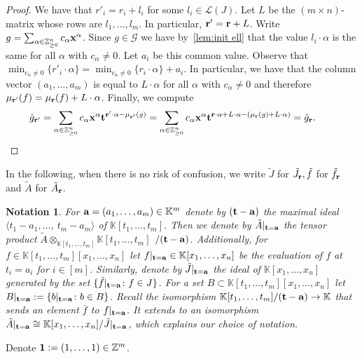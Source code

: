 \documentclass[10pt,a4paper]{amsart}
\newcommand{\thlabel}[1]{\label{#1}}
\newcommand{\thref}[1]{\ref{#1}}
\newtheorem{Notation}[Theorem]{Notation}
\numberwithin{equation}{section}
\begin{document}
\begin{proof}
We have that $r'_i=r_i+l_i$ for some $l_i \in \mathcal{L}(J)$. Let $L$ be the $(m \times n)$-matrix whose rows are $l_1, \dots , l_m$. In particular, ${\bf r'}={\bf r}+L$.
Write $g=\sum_{\alpha \in \mathbb Z^n_{\geq 0}}c_{\alpha} {\bf x}^{\alpha}$.
Since $g \in \mathcal{G}$ we have by~\thref{lem:init ell} that the value $l_i \cdot \alpha$ is the same for all $\alpha $ with $c_{\alpha}\neq 0$. Let $a_i$ be this common value.
Observe that $\min_{c_\alpha \neq 0}\{r'_i\cdot \alpha\}= \min_{c_\alpha \neq 0}\{r_i\cdot \alpha\}+a_i$. In particular, we have that the column vector $ (a_1, \dots , a_m)$ is equal to $ L \cdot \alpha$ for all $\alpha$ with $c_{\alpha}\neq 0$ and therefore $\mu_{\bf r'}(f)= \mu_{\bf r}(f)+L\cdot \alpha$.
Finally, we compute
\begin{displaymath}
\tilde{g}_{\bf r'}=\sum_{\alpha \in \mathbb Z^n_{\geq 0}}c_{\alpha} {\bf x}^{\alpha}{\bf t}^{{\bf r}'\cdot \alpha-\mu_{\bf r'}(g)}=
\sum_{\alpha \in \mathbb Z^n_{\geq 0}}c_{\alpha} {\bf x}^{\alpha}{\bf t}^{{\bf r}\cdot \alpha+ L\cdot \alpha -(\mu_{\bf r}(g)+L\cdot \alpha)}=
\tilde{g}_{\bf r}.\tag*{\qed}
\end{displaymath}
\renewcommand{\qed}{}
\end{proof}

In the following, when there is no risk of confusion, we write $\tilde J$ for $\tilde J_{\bf r},\tilde f$ for $\tilde f_{\bf r}$ and $\tilde A$ for $\tilde A_{\bf r}$.

{\samepage\begin{Notation}\thlabel{notation}
For ${\bf a}=(a_1, \dots , a_m)\in \mathbb K^m$ denote by $({\bf t}-{\bf a})$ the maximal ideal $\langle t_1-a_1,\dots$, \mbox{$t_m-a_m\rangle$} of $\mathbb K[t_1,\dots,t_m]$.
Then we denote by $\tilde A\vert_{{\bf t}={\bf a}}$ the tensor product $\tilde A\otimes_{\mathbb K[t_1,\dots,t_m]} \mathbb K[t_1,\dots,t_m]$ $/({\bf t}-{\bf a})$.
Additionally, for $f\in \mathbb K[t_1,\dots,t_m][x_1,\dots,x_n]$ let $f\vert_{{\bf t}={\bf a}} \in \mathbb K[x_1,\dots,x_n]$ be the evaluation of $f$ at $t_i = a_i$ for $i \in [m]$.
Similarly, denote by $\tilde J\vert_{{\bf t}={\bf a}}$ the ideal of $\mathbb K[x_1,\dots,x_n]$ generated by the set $\lbrace \tilde{f}\vert_{{\bf t}={\bf a}} \colon f\in J \rbrace$.
For a set $B\subset \mathbb K[t_1,\dots,t_m][x_1,\dots,x_n]$ let $B\vert_{{\bf t}={\bf a}}:=\{b\vert_{{\bf t}={\bf a}}\colon b\in B\}$.
Recall the isomorphism $\mathbb K[t_1,\dots,t_m]/({\bf t}-{\bf a})\to \mathbb K$ that sends an element $\bar f$ to $f\vert_{{\bf t}={\bf a}}$.
It extends to an isomorphism $\tilde A\vert_{{\bf t}={\bf a}}\cong \mathbb K[x_1,\dots,x_n]/\tilde J\vert_{{\bf t}={\bf a}}$, which explains our choice of notation.
\end{Notation}

Denote ${\bf 1}:=(1,\dots,1)\in \mathbb Z^m$.

}
\end{document}
